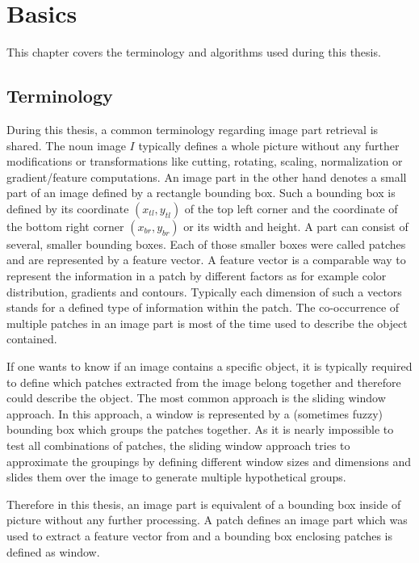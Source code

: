 \chapter{Basics}

This chapter covers the terminology and algorithms used during this thesis. 

\section{Terminology}

During this thesis, a common terminology regarding image part retrieval is shared. The noun image $I$ typically defines a whole picture without any further modifications or transformations like cutting, rotating, scaling, normalization or gradient/feature computations. An image part in the other hand denotes a small part of an image defined by a rectangle bounding box. Such a bounding box is defined by its coordinate $(x_{tl},y_{tl})$ of the top left corner and the coordinate of the bottom right corner $(x_{br},y_{br})$ or its width and height. A part can consist of several, smaller bounding boxes. Each of those smaller boxes were called patches and are represented by a feature vector. A feature vector is a comparable way to represent the information in a patch by different factors as for example color distribution, gradients and contours. Typically each dimension of such a vectors stands for a defined type of information within the patch. The co-occurrence of multiple patches in an image part is most of the time used to describe the object contained.

If one wants to know if an image contains a specific object, it is typically required to define which patches extracted from the image belong together and therefore could describe the object. The most common approach is the sliding window approach. In this approach, a window is represented by a (sometimes fuzzy) bounding box which groups the patches together. As it is nearly impossible to test all combinations of patches, the sliding window approach tries to approximate the groupings by defining different window sizes and dimensions and slides them over the image to generate multiple hypothetical groups.

Therefore in this thesis, an image part is equivalent of a bounding box inside of picture without any further processing. A patch defines an image part which was used to extract a feature vector from and a bounding box enclosing patches is defined as window.